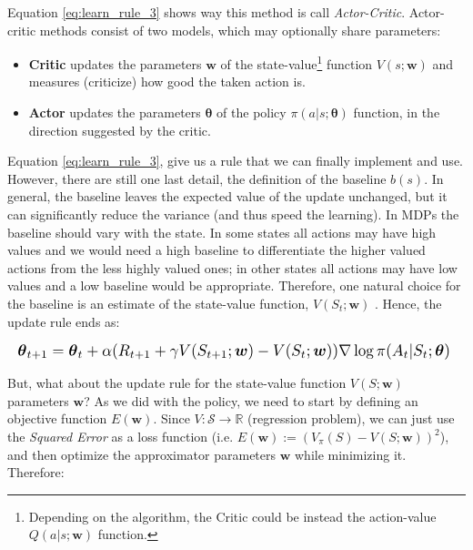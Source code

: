 \documentclass[twoside,twocolumn]{article}
\begin{document}
Equation \ref{eq:learn_rule_3} shows way this method is call \emph{Actor-Critic}. Actor-critic methods consist of two models, which may optionally share parameters:
\begin{itemize}
  \item \textbf{Critic} updates the parameters $\boldsymbol{w}$ of the state-value\footnote{Depending on the algorithm, the Critic could be instead the action-value $Q(a|s;\boldsymbol{w})$ function.} function $V(s; \boldsymbol{w})$ and measures (criticize) how good the taken action is.
  \item \textbf{Actor} updates the parameters $\boldsymbol{\theta}$ of the policy $\pi(a|s; \boldsymbol{\theta})$ function, in the direction suggested by the critic.
\end{itemize}

Equation \ref{eq:learn_rule_3}, give us a rule that we can finally implement and use. However, there are still one last detail, the definition of the baseline $b(s)$. In general, the baseline leaves the expected value of the update unchanged, but it can significantly reduce the variance (and thus speed the learning). In MDPs the baseline should vary with the state.
In some states all actions may have high values and we would need a high baseline to differentiate the higher valued actions from the less highly valued ones; in other states all actions may have low values and a low baseline would be appropriate.
Therefore, one natural choice for the baseline is an estimate of the state-value function, $V(S_{t};\boldsymbol{w})$ \cite{Sutton1998}.
Hence, the update rule ends as:

\begin{equation*}
  \resizebox{1\linewidth}{!}{%
  $
    \boldsymbol{\theta}_{t+1} = \boldsymbol{\theta}_{t} + \alpha (R_{t+1} + \gamma V(S_{t+1};\boldsymbol{w}) - V(S_{t};\boldsymbol{w})) \nabla \log{\pi (A_t|S_t; \boldsymbol{\theta})}
  $
  }
\end{equation*}

But, what about the update rule for the state-value function $V(S;\boldsymbol{w})$ parameters $\boldsymbol{w}$? As we did with the policy, we need to start by defining an objective function $E(\boldsymbol{w})$. Since $V: \mathcal{S} \rightarrow \mathbb{R}$ (regression problem), we can just use the \emph{Squared Error} as a loss function (i.e. $E(\boldsymbol{w}):=(V_{\pi}(S) - V(S;\boldsymbol{w}))^2$), and then optimize the approximator parameters $\boldsymbol{w}$ while minimizing it. Therefore:
\end{document}
